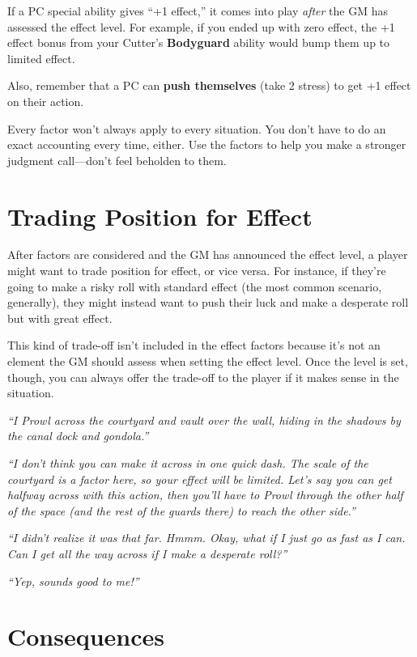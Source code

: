 \documentclass[11pt,fleqn,a5paper]{book}
\newcommand{\gameterm}[1]{\textbf{#1}}
\begin{document}
If a PC special ability gives “+1 effect,” it comes into play \emph{after} the GM has assessed the effect level. For example, if you ended up with zero effect, the +1 effect bonus from your Cutter’s \gameterm{Bodyguard}  ability would bump them up to limited effect.

Also, remember that a PC can \textbf{push themselves} (take 2 stress) to get +1 effect on their action.

Every factor won’t always apply to every situation. You don’t have to do an exact accounting every time, either. Use the factors to help you make a stronger judgment call---don’t feel beholden to them.

\section{Trading Position for Effect}

After factors are considered and the GM has announced the effect level, a player might want to trade position for effect, or vice versa. For instance, if they’re going to make a risky roll with standard effect (the most common scenario, generally), they might instead want to push their luck and make a desperate roll but with great effect.

This kind of trade-off isn’t included in the effect factors because it’s not an element the GM should assess when setting the effect level. Once the level is set, though, you can always offer the trade-off to the player if it makes sense in the situation.

\emph{“I Prowl across the courtyard and vault over the wall, hiding in the shadows by the canal dock and gondola.”}

\emph{“I don’t think you can make it across in one quick dash. The scale of the courtyard is a factor here, so your effect will be limited. Let’s say you can get halfway across with this action, then you’ll have to Prowl through the other half of the space (and the rest of the guards there) to reach the other side.”}

\emph{“I didn’t realize it was that far. Hmmm. Okay, what if I just go as fast as I can. Can I get all the way across if I make a desperate roll?”}

\emph{“Yep, sounds good to me!”}

\section{Consequences}
\end{document}
